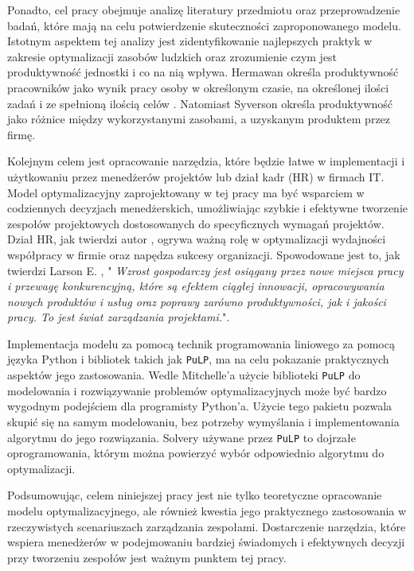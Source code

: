 \par Ponadto, cel pracy obejmuje analizę literatury przedmiotu oraz przeprowadzenie badań, które mają na celu potwierdzenie skuteczności zaproponowanego modelu. Istotnym aspektem tej analizy jest zidentyfikowanie najlepszych praktyk w zakresie optymalizacji zasobów ludzkich oraz zrozumienie czym jest produktywność jednostki i co na nią wpływa. Hermawan określa produktywność pracowników jako wynik pracy osoby w określonym czasie, na określonej ilości zadań i ze spełnioną ilością celów \parencite{hermawan2020optimizing}. Natomiast Syverson \parencite{syverson2011determines} określa produktywność jako różnice między wykorzystanymi zasobami, a uzyskanym produktem przez firmę.

\par Kolejnym celem jest opracowanie narzędzia, które będzie łatwe w implementacji i użytkowaniu przez menedżerów projektów lub dział kadr (HR) w firmach IT. Model optymalizacyjny zaprojektowany w tej pracy ma być wsparciem w codziennych decyzjach menedżerskich, umożliwiając szybkie i efektywne tworzenie zespołów projektowych dostosowanych do specyficznych wymagań projektów. Dział HR, jak twierdzi autor \parencite{sihombing2024optimizing}, ogrywa ważną rolę w optymalizacji wydajności współpracy w firmie oraz napędza sukcesy organizacji. Spowodowane jest to, jak twierdzi Larson E. \parencite{larson2014project}, "\textit{ Wzrost gospodarczy jest osiągany przez nowe miejsca pracy i przewagę konkurencyjną, które są efektem ciągłej innowacji, opracowywania nowych produktów i usług oraz poprawy zarówno produktywności, jak i jakości pracy. To jest świat zarządzania projektami.}".

\par Implementacja modelu za pomocą technik programowania liniowego za pomocą języka Python i bibliotek takich jak \verb|PuLP|, ma na celu pokazanie praktycznych aspektów jego zastosowania. Wedle Mitchelle'a \parencite{mitchell2009introduction} użycie biblioteki \verb|PuLP| do modelowania i rozwiązywanie problemów optymalizacyjnych może być bardzo wygodnym podejściem dla programisty Python'a. Użycie tego pakietu pozwala skupić się na samym modelowaniu, bez potrzeby wymyślania i implementowania algorytmu do jego rozwiązania. Solvery używane przez \verb|PuLP| to dojrzałe oprogramowania, którym można powierzyć wybór odpowiednio algorytmu do optymalizacji. 



\par Podsumowując, celem niniejszej pracy jest nie tylko teoretyczne opracowanie modelu optymalizacyjnego, ale również kwestia jego praktycznego zastosowania w rzeczywistych scenariuszach zarządzania zespołami. Dostarczenie narzędzia, które wspiera menedżerów w podejmowaniu bardziej świadomych i efektywnych decyzji przy tworzeniu zespołów jest ważnym punktem tej pracy. 

